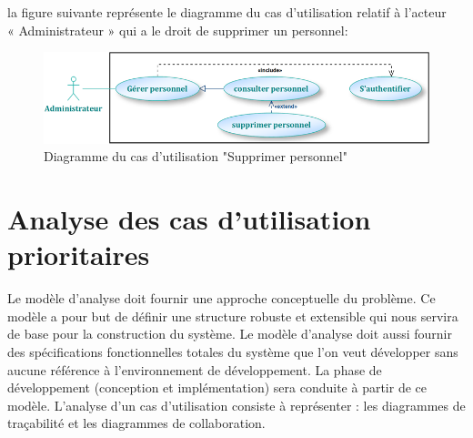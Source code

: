 \documentclass[12 pt]{report}
\begin{document}
la figure suivante représente le diagramme du cas d’utilisation  relatif à l’acteur \\« Administrateur » qui a le droit de supprimer un personnel:
\begin{figure}[h]
 \begin{center}
\includegraphics[width=12 cm ,height= 4 cm]{a5.PNG}
\caption{Diagramme du cas d’utilisation "Supprimer personnel"}
\end{center}
\end{figure}
\newpage
\section{Analyse des cas d’utilisation prioritaires }
Le modèle d’analyse doit fournir une approche conceptuelle du problème. Ce modèle a
pour but de définir une structure robuste et extensible qui nous servira de base pour la
construction du système.
Le modèle d’analyse doit aussi fournir des spécifications fonctionnelles totales du système
que l’on veut développer sans aucune référence à l’environnement de développement. La
phase de développement (conception et implémentation) sera conduite à partir de ce
modèle.
L’analyse d’un cas d’utilisation consiste à représenter : les diagrammes de traçabilité et les
diagrammes de collaboration.
\end{document}
